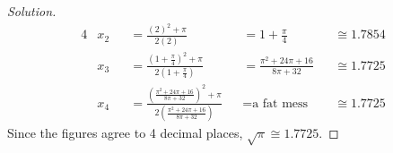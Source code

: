 \begin{enumerate}[(a)]
\begin{enumerate}[(i)]
\begin{proof}[Solution]
\begin{alignat*}{4}
                     & x_2                              &  & = \frac{(2)^2+\pi}{2(2)}                                                           &
                     & = 1+\frac\pi4                    &  & \cong 1.7854                                                                         \\
                     & x_3                              &  & = \frac{(1+\frac\pi4)^2+\pi}{2(1+\frac\pi4)}                                       &
                     & = \frac{\pi^2+24\pi+16}{8\pi+32} &  & \cong 1.7725                                                                         \\
                     & x_4                              &  & = \frac{(\frac{\pi^2+24\pi+16}{8\pi+32})^2+\pi}{2(\frac{\pi^2+24\pi+16}{8\pi+32})} &
                     & = \textrm{a fat mess}            &  & \cong 1.7725
                  \end{alignat*}
                  Since the figures agree to 4 decimal places, $\sqrt{\pi} \cong 1.7725$.
                \end{proof}
        \end{enumerate}
\end{enumerate}


